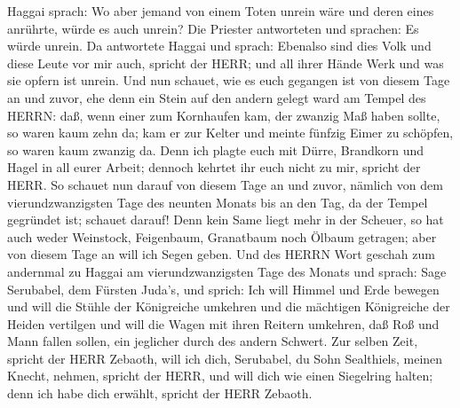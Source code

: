  Haggai sprach: Wo aber jemand von einem Toten unrein wäre
und deren eines anrührte, würde es auch unrein? Die Priester antworteten
und sprachen: Es würde unrein.  Da antwortete Haggai und
sprach: Ebenalso sind dies Volk und diese Leute vor mir auch, spricht
der HERR; und all ihrer Hände Werk und was sie opfern ist unrein.
 Und nun schauet, wie es euch gegangen ist von diesem Tage
an und zuvor, ehe denn ein Stein auf den andern gelegt ward am Tempel
des HERRN:  daß, wenn einer zum Kornhaufen kam, der zwanzig
Maß haben sollte, so waren kaum zehn da; kam er zur Kelter und meinte
fünfzig Eimer zu schöpfen, so waren kaum zwanzig da.  Denn
ich plagte euch mit Dürre, Brandkorn und Hagel in all eurer Arbeit;
dennoch kehrtet ihr euch nicht zu mir, spricht der HERR. 
So schauet nun darauf von diesem Tage an und zuvor, nämlich von dem
vierundzwanzigsten Tage des neunten Monats bis an den Tag, da der Tempel
gegründet ist; schauet darauf!  Denn kein Same liegt mehr
in der Scheuer, so hat auch weder Weinstock, Feigenbaum, Granatbaum noch
Ölbaum getragen; aber von diesem Tage an will ich Segen geben.
 Und des HERRN Wort geschah zum andernmal zu Haggai am
vierundzwanzigsten Tage des Monats und sprach:  Sage
Serubabel, dem Fürsten Juda's, und sprich: Ich will Himmel und Erde
bewegen  und will die Stühle der Königreiche umkehren und
die mächtigen Königreiche der Heiden vertilgen und will die Wagen mit
ihren Reitern umkehren, daß Roß und Mann fallen sollen, ein jeglicher
durch des andern Schwert.  Zur selben Zeit, spricht der
HERR Zebaoth, will ich dich, Serubabel, du Sohn Sealthiels, meinen
Knecht, nehmen, spricht der HERR, und will dich wie einen Siegelring
halten; denn ich habe dich erwählt, spricht der HERR Zebaoth.
